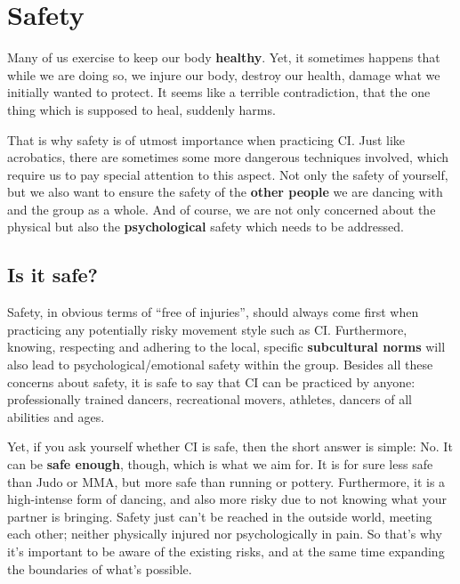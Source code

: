 \chapter{Safety}\label{ch:safety}


Many of us exercise to keep our body \textbf{healthy}.
Yet, it sometimes happens that while we are doing so, we injure our body, destroy our health, damage what we initially wanted to protect.
It seems like a terrible contradiction, that the one thing which is supposed to heal, suddenly harms.

That is why safety is of utmost importance when practicing CI\@.
Just like acrobatics, there are sometimes some more dangerous techniques involved, which require us to pay special attention to this aspect.
Not only the safety of yourself, but we also want to ensure the safety of the \textbf{other people} we are dancing with and the group as a whole.
And of course, we are not only concerned about the physical but also the \textbf{psychological} safety which needs to be addressed.

\section{Is it safe?}\label{sec:is-it-safe?}

Safety, in obvious terms of ``free of injuries'', should always come first when practicing any potentially risky movement style such as CI\@.
Furthermore, knowing, respecting and adhering to the local, specific \textbf{subcultural norms} will also lead to psychological/emotional safety within the group.
Besides all these concerns about safety, it is safe to say that CI can be practiced by anyone: professionally trained dancers, recreational movers, athletes, dancers of all abilities and ages.

Yet, if you ask yourself whether CI is safe, then the short answer is simple: No.
It can be \textbf{safe enough}, though, which is what we aim for.
It is for sure less safe than Judo or MMA, but more safe than running or pottery.
Furthermore, it is a high-intense form of dancing, and also more risky due to not knowing what your partner is bringing.
Safety just can't be reached in the outside world, meeting each other; neither physically injured nor psychologically in pain.
So that's why it's important to be aware of the existing risks, and at the same time expanding the boundaries of what's possible.

